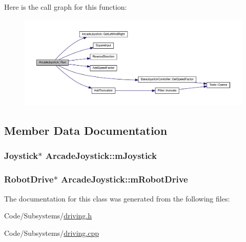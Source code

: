 \-Here is the call graph for this function\-:\nopagebreak
\begin{figure}[H]
\begin{center}
\leavevmode
\includegraphics[width=350pt]{class_arcade_joystick_a58b33ec57356a99245409e9f4c2e7fdd_cgraph}
\end{center}
\end{figure}




\subsection{\-Member \-Data \-Documentation}
\hypertarget{class_arcade_joystick_a9be7e5f362c84be3e219e1528b85ff07}{
\subsubsection[{m\-Joystick}]{\setlength{\rightskip}{0pt plus 5cm}\-Joystick$\ast$ {\bf \-Arcade\-Joystick\-::m\-Joystick}}}\label{class_arcade_joystick_a9be7e5f362c84be3e219e1528b85ff07}
\hypertarget{class_arcade_joystick_af88f7169dc340f865088eac75c97a8f9}{
\subsubsection[{m\-Robot\-Drive}]{\setlength{\rightskip}{0pt plus 5cm}\-Robot\-Drive$\ast$ {\bf \-Arcade\-Joystick\-::m\-Robot\-Drive}}}\label{class_arcade_joystick_af88f7169dc340f865088eac75c97a8f9}


\-The documentation for this class was generated from the following files\-:\begin{DoxyCompactItemize}
\item 
\-Code/\-Subsystems/\hyperlink{driving_8h}{driving.\-h}\item 
\-Code/\-Subsystems/\hyperlink{driving_8cpp}{driving.\-cpp}\end{DoxyCompactItemize}
